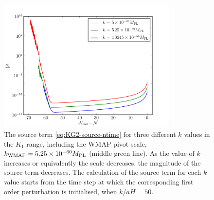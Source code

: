 \begin{figure}[htbp]
\centering
 \includegraphics[width=0.8\textwidth]{numerical/graphs/src-3ks-large}
\caption[Source Term at Three Different Values of $k$]{The source term
\eqref{eq:KG2-source-ntime} for three different $k$
values in the $K_1$ range, including the WMAP
pivot scale, $k_\mathrm{WMAP}=5.25\times 10^{-60}M_{\mathrm{PL}}$ (middle green line). As the value of $k$
increases or equivalently the scale decreases, the magnitude of the source term
decreases. The calculation of the source term for each $k$ value starts from the
time step at which the corresponding first order perturbation is initialised, \iec
when $k/aH = 50$.
}
\label{fig:src-3ks}
\end{figure}
% 
% 

